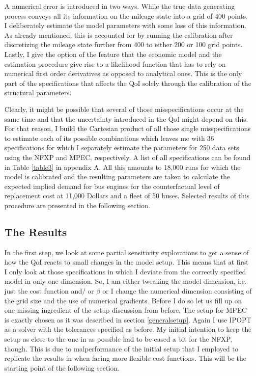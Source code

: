 A numerical error is introduced in two ways. While the true data generating process conveys all its information on the mileage state into a grid of 400 points, I deliberately estimate the model parameters with some loss of this information. As already mentioned, this is accounted for by running the calibration after discretizing the mileage state further from 400 to either 200 or 100 grid points. Lastly, I give the option of the feature that the economic model and the estimation procedure give rise to a likelihood function that has to rely on numerical first order derivatives as opposed to analytical ones. This is the only part of the specifications that affects the QoI solely through the calibration of the structural parameters.

Clearly, it might be possible that several of those misspecifications occur at the same time and that the uncertainty introduced in the QoI might depend on this. For that reason, I build the Cartesian product of all those single misspecifications to estimate each of its possible combinations which leaves me with 36 specifications for which I separately estimate the parameters for 250 data sets using the NFXP and MPEC, respectively. A list of all specifications can be found in Table \ref{table3} in appendix A. All this amounts to 18,000 runs for which the model is calibrated and the resulting parameters are taken to calculate the expected implied demand for bus engines for the counterfactual level of replacement cost at 11,000 Dollars and a fleet of 50 buses. Selected results of this procedure are presented in the following section.

\subsection{The Results}

In the first step, we look at some partial sensitivity explorations to get a sense of how the QoI reacts to small changes in the model setup. This means that at first I only look at those specifications in which I deviate from the correctly specified model in only one dimension. So, I am either tweaking the model dimension, i.e. just the cost function and/ or $\beta$ or I change the numerical dimension consisting of the grid size and the use of numerical gradients. Before I do so let us fill up on one missing ingredient of the setup discussion from before. The setup for MPEC is exactly chosen as it was described in section \ref{generalsetup}. Again I use IPOPT as a solver with the tolerances specified as before. My initial intention to keep the setup as close to the one in \cite{Iskhakov.2016} as possible had to be eased a bit for the NFXP, though. This is due to malperformance of the initial setup that I employed to replicate the results in \cite{Iskhakov.2016} when facing more flexible cost functions. This will be the starting point of the following section.


